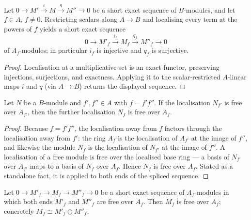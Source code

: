 \begin{lemma}
  \label{lem:gf_splice_shortExact_localized_exact}
  Let \(0 \to M' \xrightarrow{i} M \xrightarrow{q} M'' \to 0\) be a short exact
  sequence of \(B\)-modules, and let \(f \in A\), \(f \ne 0\). Restricting scalars
  along \(A \to B\) and localising every term at the powers of \(f\) yields a short
  exact sequence
  \[
    0 \to M'_f \xrightarrow{i_f} M_f \xrightarrow{q_f} M''_f \to 0
  \]
  of \(A_f\)-modules; in particular \(i_f\) is injective and \(q_f\) is surjective.
\end{lemma}

\begin{proof}


\leanok
  Localisation at a multiplicative set is an exact functor, preserving injections,
  surjections, and exactness. Applying it to the scalar-restricted \(A\)-linear maps
  \(i\) and \(q\) (via \(A \to B\)) returns the displayed sequence.
\end{proof}

\begin{lemma}
  \label{lem:gf_splice_shortExact_free_transport}
  Let \(N\) be a \(B\)-module and \(f', f'' \in A\) with \(f = f' f''\). If the
  localisation \(N_{f'}\) is free over \(A_{f'}\), then the further localisation
  \(N_f\) is free over \(A_f\).
\end{lemma}

\begin{proof}


\leanok
  Because \(f = f' f''\), the localisation away from \(f\) factors through the
  localisation away from \(f'\): the ring \(A_f\) is the localisation of \(A_{f'}\)
  at the image of \(f''\), and likewise the module \(N_f\) is the localisation of
  \(N_{f'}\) at the image of \(f''\). A localisation of a free module is free over
  the localised base ring — a basis of \(N_{f'}\) over \(A_{f'}\) maps to a basis of
  \(N_f\) over \(A_f\). Hence \(N_f\) is free over \(A_f\). Stated as a standalone
  fact, it is applied to both ends of the spliced sequence.
\end{proof}

\begin{lemma}
  \label{lem:gf_splice_shortExact_split}
  Let \(0 \to M'_f \to M_f \to M''_f \to 0\) be a short exact sequence of
  \(A_f\)-modules in which both ends \(M'_f\) and \(M''_f\) are free over \(A_f\).
  Then \(M_f\) is free over \(A_f\); concretely \(M_f \cong M'_f \oplus M''_f\).
\end{lemma}

